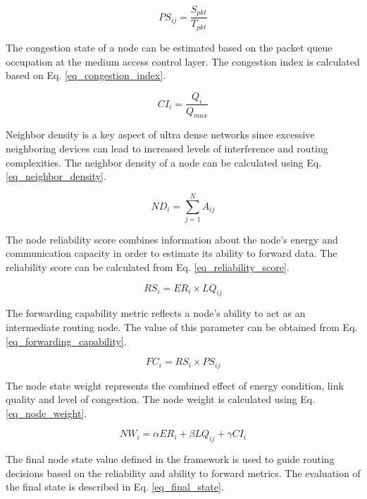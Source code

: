 \documentclass[a4paper,fleqn]{cas-dc}
\numberwithin{equation}{section}
\begin{document}
\begin{equation}
PS_{ij} = \frac{S_{pkt}}{T_{pkt}}
\label{eq_packet_success}
\end{equation}

The congestion state of a node can be estimated based on the packet queue occupation at the medium access control layer. The congestion index is calculated based on Eq. \ref{eq_congestion_index}.

\begin{equation}
CI_i = \frac{Q_i}{Q_{max}}
\label{eq_congestion_index}
\end{equation}

Neighbor density is a key aspect of ultra dense networks since excessive neighboring devices can lead to increased levels of interference and routing complexities. The neighbor density of a node can be calculated using Eq. \ref{eq_neighbor_density}.

\begin{equation}
ND_i = \sum_{j=1}^{N} A_{ij}
\label{eq_neighbor_density}
\end{equation}

The node reliability score combines information about the node's energy and communication capacity in order to estimate its ability to forward data. The reliability score can be calculated from Eq. \ref{eq_reliability_score}.

\begin{equation}
RS_i = ER_i \times LQ_{ij}
\label{eq_reliability_score}
\end{equation}

The forwarding capability metric reflects a node's ability to act as an intermediate routing node. The value of this parameter can be obtained from Eq. \ref{eq_forwarding_capability}.

\begin{equation}
FC_i = RS_i \times PS_{ij}
\label{eq_forwarding_capability}
\end{equation}

The node state weight represents the combined effect of energy condition, link quality and level of congestion. The node weight is calculated using Eq. \ref{eq_node_weight}.

\begin{equation}
NW_i = \alpha ER_i + \beta LQ_{ij} + \gamma CI_i
\label{eq_node_weight}
\end{equation}

The final node state value defined in the framework is used to guide routing decisions based on the reliability and ability to forward metrics. The evaluation of the final state is described in Eq. \ref{eq_final_state}.
\end{document}

